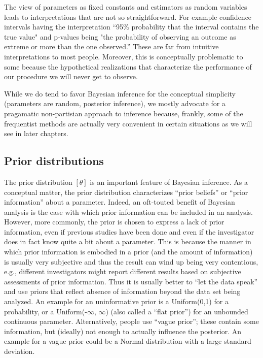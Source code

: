 The view of parameters as fixed constants and estimators as random variables
leads to interpretations that are not so straightforward. For
example confidence intervals having the interpretation ``95\%
probability that the interval contains the true value" and p-values
being "the probability of observing an outcome as extreme or more than
the one observed.'' These are far from intuitive interpretations to
most people.  Moreover, this is conceptually problematic to some
because the hypothetical realizations that characterize the
performance of our procedure we will never get to observe.

While we do tend to favor Bayesian inference for the conceptual
simplicity (parameters are random, posterior inference), we mostly
advocate for a pragamatic non-partisian approach to inference because,
frankly, some of the frequentist methods are actually very
convenient in certain situations as we will see in later chapters.


\subsection{Prior distributions}

The prior distribution $[\theta]$ is an important feature of Bayesian
inference. As a conceptual matter,
the prior distribution characterizes ``prior beliefs'' or ``prior
information'' about a parameter. Indeed,
an oft-touted benefit of Bayesian analysis is the ease with which
prior information can be included in an analysis. 
However, more commonly, the prior is chosen to
express a lack of prior information, even if previous studies have
been done and even if the investigator does in fact know quite a bit
about a parameter.
This is because
the manner in which prior information is embodied in a prior (and the
amount of information) is
usually very subjective and thus the result can wind up being very
contentious, e.g., different investigators might report different
results based on subjective assessments of prior information. Thus it is usually
better to ``let the data speak'' and use priors that reflect absence
of information beyond the data set being analyzed. An example for an uninformative prior is a Uniform(0,1) for a probability, or a Uniform(-$\infty$, $\infty$) (also called a ``flat prior'') for an unbounded continuous parameter. Alternatively, people use ``vague prior''; these contain some information, but (ideally) not enough to actually influence the posterior. An example for a vague prior could be a Normal distribution with a large standard deviation.

